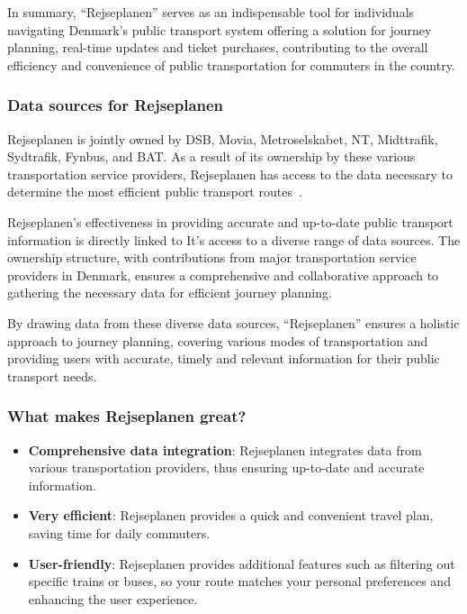 In summary, ``Rejseplanen'' serves as an indispensable tool for individuals navigating Denmark's public transport system
offering a solution for journey planning, real-time updates and ticket purchases, contributing to the overall efficiency
and convenience of public transportation for commuters in the country.

\subsubsection{Data sources for Rejseplanen}\label{subsubsec:where-does-rejseplanen-get-their-data-from?}

Rejseplanen is jointly owned by DSB, Movia, Metroselskabet, NT, Midttrafik, Sydtrafik, Fynbus, and BAT\@.
As a result of its ownership by these various transportation service providers, Rejseplanen has access to the data
necessary to determine the most efficient public transport routes~\cite{rejseplanen2023}.

Rejseplanen's effectiveness in providing accurate and up-to-date public transport information is directly linked to It's
access to a diverse range of data sources.
The ownership structure, with contributions from major transportation service providers in Denmark, ensures a
comprehensive and collaborative approach to gathering the necessary data for efficient journey planning.

By drawing data from these diverse data sources, ``Rejseplanen'' ensures a holistic approach to journey planning,
covering various modes of transportation and providing users with accurate, timely and relevant information for their
public transport needs.

\subsubsection{What makes Rejseplanen great?}\label{subsubsec:what-makes-rejseplanen-great?}

\begin{itemize}
    \item \textbf{Comprehensive data integration}: Rejseplanen integrates data from various transportation providers,
    thus ensuring up-to-date and accurate information.
    \item \textbf{Very efficient}: Rejseplanen provides a quick and convenient travel plan, saving time for daily
    commuters.
    \item \textbf{User-friendly}: Rejseplanen provides additional features such as filtering out specific trains or
    buses, so your route matches your personal preferences and enhancing the user experience.
\end{itemize}

